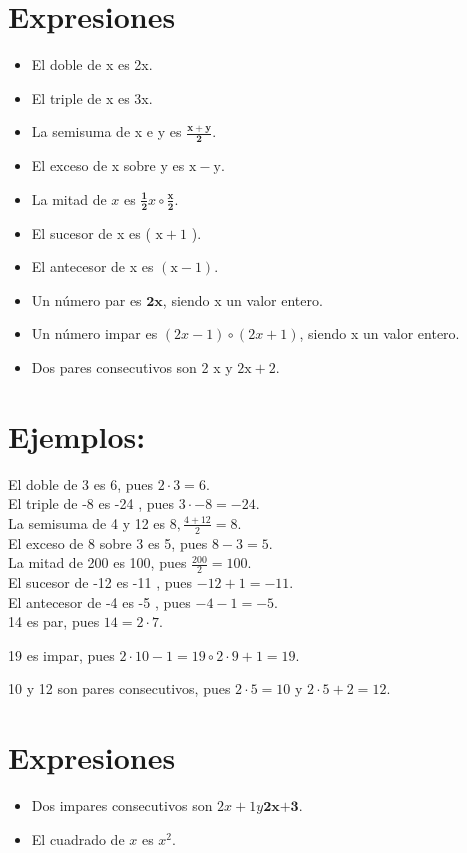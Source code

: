 \documentclass[10pt]{article}
\begin{document}
\section*{Expresiones}
\begin{itemize}
  \item El doble de x es 2x.
  \item El triple de x es 3x.
  \item La semisuma de x e y es $\frac{\mathbf{x + y}}{\mathbf{2}}$.
  \item El exceso de x sobre y es $\mathrm{x}-\mathrm{y}$.
  \item La mitad de $x$ es $\frac{\mathbf{1}}{\mathbf{2}} x \circ \frac{\mathbf{x}}{\mathbf{2}}$.
  \item El sucesor de x es ( $\mathrm{x}+1$ ).
  \item El antecesor de x es $(\mathrm{x}-1)$.
  \item Un número par es $\mathbf{2 x}$, siendo x un valor entero.
  \item Un número impar es $(2 x-1) \circ(2 x+1)$, siendo x un valor entero.
  \item Dos pares consecutivos son 2 x y $2 \mathrm{x}+2$.
\end{itemize}

\section*{Ejemplos:}
El doble de 3 es 6, pues $2 \cdot 3=6$.\\
El triple de -8 es -24 , pues $3 \cdot-8=-24$.\\
La semisuma de 4 y 12 es $8, \frac{4+12}{2}=8$.\\
El exceso de 8 sobre 3 es 5, pues $8-3=5$.\\
La mitad de 200 es 100, pues $\frac{200}{2}=100$.\\
El sucesor de -12 es -11 , pues $-12+1=-11$.\\
El antecesor de -4 es -5 , pues $-4-1=-5$.\\
14 es par, pues $14=2 \cdot 7$.

19 es impar, pues $2 \cdot 10-1=19 \circ 2 \cdot 9+1=19$.

10 y 12 son pares consecutivos, pues $2 \cdot 5=10$ y $2 \cdot 5+2=12$.

\section*{Expresiones}
\begin{itemize}
  \item Dos impares consecutivos son $2 x+1 y \mathbf{2 x} \boldsymbol{+} \mathbf{3} \boldsymbol{.}$
  \item El cuadrado de $x$ es $x^{2}$.
\end{itemize}
\end{document}
